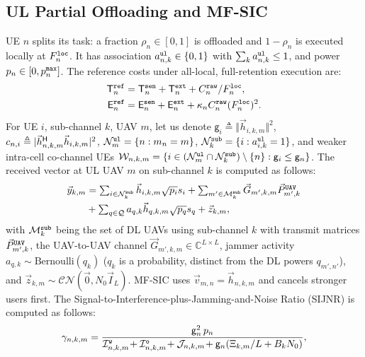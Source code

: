 \documentclass[journal]{IEEEtran}
\begin{document}
\subsection{UL Partial Offloading and MF-SIC}
\label{sec:ul}
UE $n$ splits its task: a fraction $\rho_n\in[0,1]$ is offloaded and $1-\rho_n$ is executed locally at $F_n^{\tt loc}$. It has association $a_{n,k}^{\tt ul}\in\{0,1\}$ with $\sum_k a_{n,k}^{\tt ul}\le 1$, and power $p_n\in[0,p_n^{\tt max}]$. The reference costs under all-local, full-retention execution are:
\begin{align}
\mathsf{T}_n^{\tt ref}&=\mathsf{T}_n^{\tt sen}+\mathsf{T}_n^{\tt ext}+C_n^{\tt raw}/F_n^{\tt loc},\label{eq:ref}\\
\mathsf{E}_n^{\tt ref}&=\mathsf{E}_n^{\tt sen}+\mathsf{E}_n^{\tt ext}+\kappa_n C_n^{\tt raw}(F_n^{\tt loc})^2 .\nonumber
\end{align}
For UE $i$, sub-channel $k$, UAV $m$, let us denote $\mathsf{g}_i\triangleq\Vert\vec{h}_{i,k,m}\Vert^2$, $c_{n,i}\triangleq|\vec{h}_{n,k,m}^{\sf H}\vec{h}_{i,k,m}|^2$, 
$\mathcal{N}_m^{\tt ul}=\{n:m_n=m\}$,
$\mathcal{N}_k^{\tt sub}=\{i:a_{i,k}^{\tt ul}=1\}$, and weaker intra-cell co-channel UEs $\mathcal{W}_{n,k,m}=\{i\in(\mathcal{N}_m^{\tt ul}\cap\mathcal{N}_k^{\tt sub})\setminus\{n\}:\mathsf{g}_i\le\mathsf{g}_n\}$.
The received vector at UL UAV $m$ on sub-channel $k$ is computed as follows:
\begin{equation}
\begin{aligned}
\textstyle\vec{y}_{k,m}&=\textstyle\sum_{i\in\mathcal{N}_k^{\tt sub}}\vec{h}_{i,k,m}\sqrt{p_i}s_i+\sum_{m'\in\mathcal{M}_k^{\tt sub}}\vec{G}_{m',k,m}\vec{P}_{m',k}^{\tt UAV}\\
&\textstyle+\sum_{q\in\mathcal{Q}}a_{q,k}\vec{h}_{q,k,m}\sqrt{p_q}s_q+\vec{z}_{k,m},
\end{aligned}
\label{eq:ul_y}
\end{equation}
with $\mathcal{M}_k^{\tt sub}$ being the set of DL UAVs using sub-channel $k$ with transmit matrices $\vec{P}_{m',k}^{\tt UAV}$, the UAV-to-UAV channel $\vec{G}_{m',k,m}\in\mathbb{C}^{L\times L}$, jammer activity $a_{q,k}\sim\mathrm{Bernoulli}(q_k)$ ($q_k$ is a probability, distinct from the DL powers $q_{m',n'}$), and $\vec{z}_{k,m}\sim\mathcal{CN}(\vec{0},N_0\vec{I}_L)$. MF-SIC uses $\vec{v}_{m,n}=\vec{h}_{n,k,m}$ and cancels stronger users first. The Signal-to-Interference-plus-Jamming-and-Noise Ratio (SIJNR) is computed as follows:
\begin{equation}
\gamma_{n,k,m}
=\frac{\mathsf{g}_n^2\, p_n}
{\mathcal{I}_{n,k,m}^{\tt w}\!+\mathcal{I}_{n,k,m}^{\tt o}\!+\mathcal{J}_{n,k,m}
\!+\mathsf{g}_n(\Xi_{k,m}/L+B_kN_0)},
\label{eq:ul_sijnr}
\end{equation}
\end{document}
